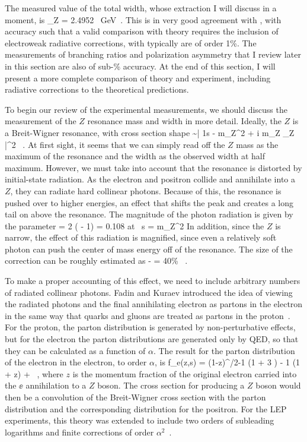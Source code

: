 \documentclass[12pt]{article}
\begin{document}
The measured value of the total width, whose extraction I will discuss
in a moment, is 
\beq
    \Gamma_Z = 2.4952 ~\mbox{GeV}\ .
\eeqn
This is in very good agreement with , with accuracy
such that a valid comparison with theory requires the inclusion of
electroweak radiative corrections, with typically are of order 1\%.
The measurements of branching ratios and polarization asymmetry that I
review later in this section are also of sub-\% accuracy.   At the end
of this section, I will present a more complete comparison of
theory and experiment, including radiative corrections to the
theoretical predictions.

To begin our review of the experimental measurements, we should
discuss the measurement of the $Z$ resonance mass and width in more
detail.  Ideally, the $Z$ is a Breit-Wigner resonance, with cross
section shape
\beq
    \sigma \sim \biggl|  {1\over s - m_Z^2 + i m_Z \Gamma_Z} \biggr|^2
    \ .
At first sight, it seems that we can simply read off the $Z$ mass as
the maximum of the resonance and the width as the observed width at
half maximum.  However, we must take into account that the resonance
is  distorted by initial-state radiation.   As the electron and
positron collide and annihilate into a $Z$, they can radiate hard
collinear 
photons.  Because of this, the resonance is pushed over to higher
energies, an effect that shifts the peak and creates a long tail on
above the resonance.   The magnitude of the photon radiation is given
by the parameter
\beq
   \beta  =  {2\alpha\over \pi} ( - 1) =  0.108
   \quad \mbox{at} \ s = m_Z^2 
\eeqn
In addition, since the $Z$ is narrow, the effect of this radiation  is
magnified, since even a relatively soft photon can push the center of
mass energy off of the resonance.   The size of the correction can be
roughly 
estimated as 
\beq
           - \beta \cdot {} = 40\% \ . 
\eeqn

To make a proper accounting of this effect, we need to include
arbitrary numbers of radiated collinear photons.  Fadin and Kuraev
introduced the idea of viewing the radiated photons and the final
annihilating electron as partons in the electron in the same way that
quarks and gluons are treated as partons in the proton~\cite{FK}.
For the proton, the parton distribution is generated by
non-perturbative effects, but for the electron  the parton
distributions are generated only by QED, so that they can be
calculated as a function of $\alpha$.  The result for the parton
distribution of the electron in the electron, to order $\alpha$, is
\beq
   f_e(z,s) = {\beta{}} (1-z)^{\beta/2-1} (1 + {3} \beta)
   - {1} \beta (1 + z) + \cdots \ , 
where $z$ is the momentum fraction of the original electron carried
into the $\ee$ annihilation to a $Z$ boson.   The cross section for
producing a $Z$ boson would then be a convolution of the Breit-Wigner
cross section  with the parton distribution 
and the corresponding distribution for the positron.  For the LEP
experiments, this theory was extended to include two orders of
subleading logarithms and finite corrections of order
$\alpha^2$~\cite{fullZwidth}.
\end{document}
